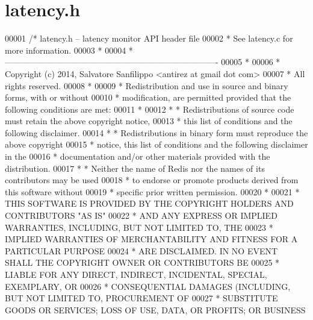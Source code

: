 \hypertarget{latency_8h_source}{}\section{latency.\+h}
\label{latency_8h_source}

\begin{DoxyCode}
00001 \textcolor{comment}{/* latency.h -- latency monitor API header file}
00002 \textcolor{comment}{ * See latency.c for more information.}
00003 \textcolor{comment}{ *}
00004 \textcolor{comment}{ * ----------------------------------------------------------------------------}
00005 \textcolor{comment}{ *}
00006 \textcolor{comment}{ * Copyright (c) 2014, Salvatore Sanfilippo <antirez at gmail dot com>}
00007 \textcolor{comment}{ * All rights reserved.}
00008 \textcolor{comment}{ *}
00009 \textcolor{comment}{ * Redistribution and use in source and binary forms, with or without}
00010 \textcolor{comment}{ * modification, are permitted provided that the following conditions are met:}
00011 \textcolor{comment}{ *}
00012 \textcolor{comment}{ *   * Redistributions of source code must retain the above copyright notice,}
00013 \textcolor{comment}{ *     this list of conditions and the following disclaimer.}
00014 \textcolor{comment}{ *   * Redistributions in binary form must reproduce the above copyright}
00015 \textcolor{comment}{ *     notice, this list of conditions and the following disclaimer in the}
00016 \textcolor{comment}{ *     documentation and/or other materials provided with the distribution.}
00017 \textcolor{comment}{ *   * Neither the name of Redis nor the names of its contributors may be used}
00018 \textcolor{comment}{ *     to endorse or promote products derived from this software without}
00019 \textcolor{comment}{ *     specific prior written permission.}
00020 \textcolor{comment}{ *}
00021 \textcolor{comment}{ * THIS SOFTWARE IS PROVIDED BY THE COPYRIGHT HOLDERS AND CONTRIBUTORS "AS IS"}
00022 \textcolor{comment}{ * AND ANY EXPRESS OR IMPLIED WARRANTIES, INCLUDING, BUT NOT LIMITED TO, THE}
00023 \textcolor{comment}{ * IMPLIED WARRANTIES OF MERCHANTABILITY AND FITNESS FOR A PARTICULAR PURPOSE}
00024 \textcolor{comment}{ * ARE DISCLAIMED. IN NO EVENT SHALL THE COPYRIGHT OWNER OR CONTRIBUTORS BE}
00025 \textcolor{comment}{ * LIABLE FOR ANY DIRECT, INDIRECT, INCIDENTAL, SPECIAL, EXEMPLARY, OR}
00026 \textcolor{comment}{ * CONSEQUENTIAL DAMAGES (INCLUDING, BUT NOT LIMITED TO, PROCUREMENT OF}
00027 \textcolor{comment}{ * SUBSTITUTE GOODS OR SERVICES; LOSS OF USE, DATA, OR PROFITS; OR BUSINESS}

\end{DoxyCode}

